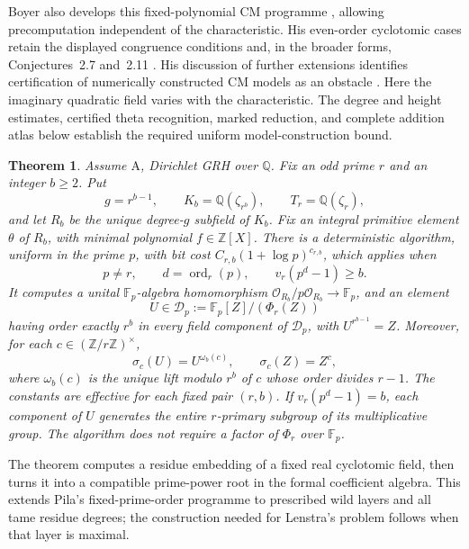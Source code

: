 \documentclass[11pt]{article}
\newtheorem{theorem}{Theorem}[section]
\theoremstyle{definition}
\theoremstyle{remark}
\begin{document}
Boyer also develops this fixed-polynomial CM programme
\citep[Chapter~III, p.~50]{Boyer2014}, allowing precomputation
independent of the characteristic. His even-order cyclotomic cases
retain the displayed congruence conditions and, in the broader forms,
Conjectures~2.7 and~2.11 \citep[pp.~65--72]{Boyer2014}.
His discussion of further extensions identifies certification of
numerically constructed CM models as an obstacle
\citep[\S3.4, p.~81]{Boyer2014}. Here the imaginary quadratic field
varies with the characteristic. The degree and height estimates,
certified theta recognition, marked reduction, and complete addition
atlas below establish the required uniform model-construction bound.

\begin{theorem}\label{thm:fixed-wild-cm}
Assume \(\mathrm A\), Dirichlet GRH over \(\mathbb Q\).
Fix an odd prime \(r\) and an integer \(b\geq2\). Put
\[
 g=r^{b-1},\qquad K_b=\mathbb Q(\zeta_{r^b}),\qquad
 T_r=\mathbb Q(\zeta_r),
\]
and let \(R_b\) be the unique degree-\(g\) subfield of \(K_b\).
Fix an integral primitive element \(\theta\) of \(R_b\), with
minimal polynomial \(f\in\mathbb Z[X]\).
There is a deterministic algorithm, uniform in the prime \(p\),
with bit cost \(C_{r,b}(1+\log p)^{c_{r,b}}\), which applies when
\[
 p\ne r,\qquad d=\operatorname{ord}_r(p),\qquad
                         v_r(p^d-1)\geq b.
\]
It computes a unital \(\mathbb F_p\)-algebra homomorphism
\(\mathcal O_{R_b}/p\mathcal O_{R_b}\longrightarrow\mathbb F_p\),
and an element
\[
 U\in\mathcal D_p:=\mathbb F_p[Z]/(\Phi_r(Z))
\]
having order exactly \(r^b\) in every field component of
\(\mathcal D_p\), with \(U^{r^{b-1}}=Z\).
Moreover, for each
\(c\in(\mathbb Z/r\mathbb Z)^\times\),
\begin{equation}
 \sigma_c(U)=U^{\omega_b(c)},\qquad \sigma_c(Z)=Z^c,
 \label{eq:fixed-wild-equivariance}
\end{equation}
where \(\omega_b(c)\) is the unique lift modulo \(r^b\) of
\(c\) whose order divides \(r-1\).
The constants are effective for each fixed pair \((r,b)\).
If \(v_r(p^d-1)=b\), each component of \(U\) generates the
entire \(r\)-primary subgroup of its multiplicative group.
The algorithm does not require a factor of \(\Phi_r\) over
\(\mathbb F_p\).
\end{theorem}

The theorem computes a residue embedding of a fixed real cyclotomic
field, then turns it into a compatible prime-power root in the formal
coefficient algebra. This extends Pila's fixed-prime-order programme
\citep[Theorem~D, author p.~2; printed p.~746]{Pila1990} to prescribed
wild layers and all tame residue degrees; the construction needed for
Lenstra's problem follows when that layer is maximal.
\end{document}
